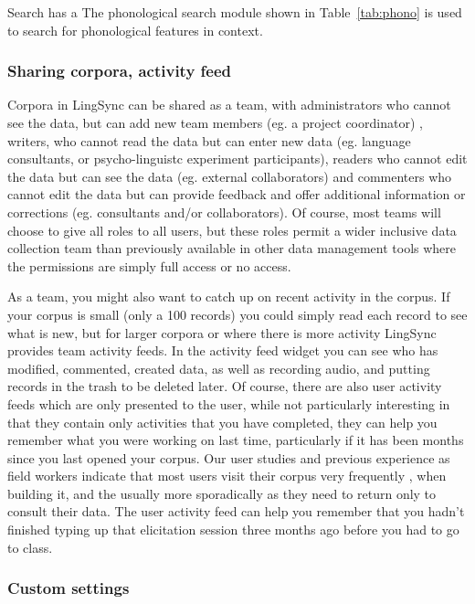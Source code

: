\documentclass[letterpaper, 12pt, dvips]{mitwpl}
\begin{document}
Search has a 
The phonological search module shown in Table~\ref{tab:phono} is used to search for phonological features in context. 

\subsubsection{Sharing corpora, activity feed}
\label{sec:sharingactivityfeeds}

Corpora in LingSync can be shared as a team, with administrators who cannot see the data, but can add new team members (eg. a project coordinator) , writers, who cannot read the data but can enter new data (eg. language consultants, or psycho-linguistc experiment participants), readers who cannot edit the data but can see the data (eg. external collaborators) and commenters  who cannot edit the data but can provide feedback and offer additional information or corrections (eg. consultants and/or collaborators).  Of course, most teams will choose to give all roles to all users, but these roles permit a wider inclusive data collection team than previously available  in other data management tools where the permissions are simply full access or no access.

As a team, you might also want to catch up on recent activity in the corpus. If your corpus is small (only a 100 records) you could simply read each record to see what is new, but for larger corpora or where there is more activity LingSync provides team activity feeds. In the activity feed widget you can see who has modified, commented, created data, as well as recording audio, and putting records in the trash to be deleted later. Of course, there are also user activity feeds which are only presented to the user, while not particularly interesting in that they contain only activities that you have completed, they can help you remember what you were working on last time, particularly if it has been months since you last opened your corpus. Our user studies and previous experience as field workers indicate that most users visit their corpus very frequently , when building it, and the usually more sporadically as they need to return only to consult their data. The user activity feed can help you remember that you hadn't finished typing up that elicitation session three months ago before you had to go to class. 

\subsubsection{Custom settings}
\end{document}
